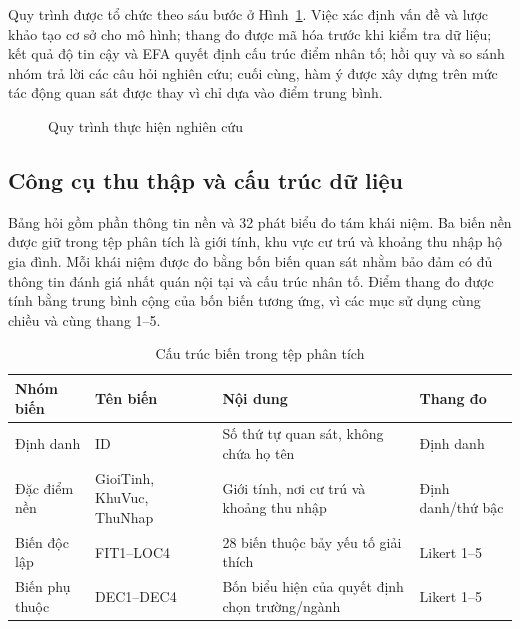 Quy trình được tổ chức theo sáu bước ở Hình~\ref{fig:research-process}. Việc xác định vấn đề và lược khảo tạo cơ sở cho mô hình; thang đo được mã hóa trước khi kiểm tra dữ liệu; kết quả độ tin cậy và EFA quyết định cấu trúc điểm nhân tố; hồi quy và so sánh nhóm trả lời các câu hỏi nghiên cứu; cuối cùng, hàm ý được xây dựng trên mức tác động quan sát được thay vì chỉ dựa vào điểm trung bình.
\begin{figure}[H]\centering
{}
\caption{Quy trình thực hiện nghiên cứu}\label{fig:research-process}
\end{figure}

\subsection{Công cụ thu thập và cấu trúc dữ liệu}
Bảng hỏi gồm phần thông tin nền và 32 phát biểu đo tám khái niệm. Ba biến nền được giữ trong tệp phân tích là giới tính, khu vực cư trú và khoảng thu nhập hộ gia đình. Mỗi khái niệm được đo bằng bốn biến quan sát nhằm bảo đảm có đủ thông tin đánh giá nhất quán nội tại và cấu trúc nhân tố. Điểm thang đo được tính bằng trung bình cộng của bốn biến tương ứng, vì các mục sử dụng cùng chiều và cùng thang 1--5.

\begin{table}[H]\centering\caption{Cấu trúc biến trong tệp phân tích}\label{tab:data-structure}
\begin{tabularx}{\textwidth}{p{3cm}p{3cm}Xp{2cm}}\toprule Nhóm biến & Tên biến & Nội dung & Thang đo\\\midrule
Định danh & ID & Số thứ tự quan sát, không chứa họ tên & Định danh\\
Đặc điểm nền & GioiTinh, KhuVuc, ThuNhap & Giới tính, nơi cư trú và khoảng thu nhập & Định danh/thứ bậc\\
Biến độc lập & FIT1--LOC4 & 28 biến thuộc bảy yếu tố giải thích & Likert 1--5\\
Biến phụ thuộc & DEC1--DEC4 & Bốn biểu hiện của quyết định chọn trường/ngành & Likert 1--5\\\bottomrule
\end{tabularx}\end{table}

